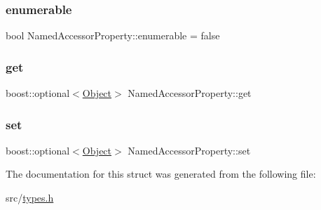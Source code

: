 \subsubsection{\texorpdfstring{enumerable}{enumerable}}
{\footnotesize\ttfamily bool Named\+Accessor\+Property\+::enumerable = false}

\mbox{\label{struct_named_accessor_property_a2d4078ef1e87e5f0507507922c6fed40}} 
\subsubsection{\texorpdfstring{get}{get}}
{\footnotesize\ttfamily boost\+::optional$<$\hyperlink{types_8h_a9ce4f5d96fcce7461a1917b47f7582dc}{Object}$>$ Named\+Accessor\+Property\+::get}

\mbox{\label{struct_named_accessor_property_a6716b808245f1325df646d3e653e197e}} 
\subsubsection{\texorpdfstring{set}{set}}
{\footnotesize\ttfamily boost\+::optional$<$\hyperlink{types_8h_a9ce4f5d96fcce7461a1917b47f7582dc}{Object}$>$ Named\+Accessor\+Property\+::set}



The documentation for this struct was generated from the following file\+:\begin{DoxyCompactItemize}
\item 
src/\hyperlink{types_8h}{types.\+h}\end{DoxyCompactItemize}
